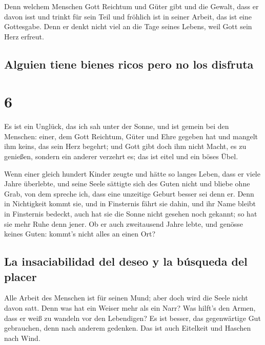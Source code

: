  Denn welchem Menschen Gott Reichtum und Güter gibt und
die Gewalt, dass er davon isst und trinkt für sein Teil und fröhlich ist
in seiner Arbeit, das ist eine Gottesgabe.  Denn er denkt
nicht viel an die Tage seines Lebens, weil Gott sein Herz erfreut.

\hypertarget{alguien-tiene-bienes-ricos-pero-no-los-disfruta}{%
\subsection{Alguien tiene bienes ricos pero no los
disfruta}\label{alguien-tiene-bienes-ricos-pero-no-los-disfruta}}

\hypertarget{section-5}{%
\section{6}\label{section-5}}

 Es ist ein Unglück, das ich sah unter der Sonne, und ist
gemein bei den Menschen:  einer, dem Gott Reichtum, Güter
und Ehre gegeben hat und mangelt ihm keins, das sein Herz begehrt; und
Gott gibt doch ihm nicht Macht, es zu genießen, sondern ein anderer
verzehrt es; das ist eitel und ein böses Übel.

 Wenn einer gleich hundert Kinder zeugte und hätte so
langes Leben, dass er viele Jahre überlebte, und seine Seele sättigte
sich des Guten nicht und bliebe ohne Grab, von dem spreche ich, dass
eine unzeitige Geburt besser sei denn er.  Denn in
Nichtigkeit kommt sie, und in Finsternis fährt sie dahin, und ihr Name
bleibt in Finsternis bedeckt,  auch hat sie die Sonne
nicht gesehen noch gekannt; so hat sie mehr Ruhe denn jener.
 Ob er auch zweitausend Jahre lebte, und genösse keines
Guten: kommt's nicht alles an einen Ort?

\hypertarget{la-insaciabilidad-del-deseo-y-la-buxfasqueda-del-placer}{%
\subsection{La insaciabilidad del deseo y la búsqueda del
placer}\label{la-insaciabilidad-del-deseo-y-la-buxfasqueda-del-placer}}

 Alle Arbeit des Menschen ist für seinen Mund; aber doch
wird die Seele nicht davon satt.  Denn was hat ein Weiser
mehr als ein Narr? Was hilft's den Armen, dass er weiß zu wandeln vor
den Lebendigen?  Es ist besser, das gegenwärtige Gut
gebrauchen, denn nach anderem gedenken. Das ist auch Eitelkeit und
Haschen nach Wind.

